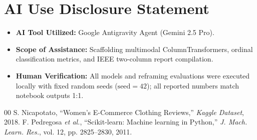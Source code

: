 \documentclass[conference]{IEEEtran}
\begin{document}
\newpage
\section*{AI Use Disclosure Statement}
\begin{itemize}
\item \textbf{AI Tool Utilized:} Google Antigravity Agent (Gemini 2.5 Pro).
\item \textbf{Scope of Assistance:} Scaffolding multimodal ColumnTransformers, ordinal classification metrics, and IEEE two-column report compilation.
\item \textbf{Human Verification:} All models and reframing evaluations were executed locally with fixed random seeds ($\text{seed}=42$); all reported numbers match notebook outputs 1:1.
\end{itemize}

\begin{thebibliography}{00}
 S. Nicapotato, ``Women's E-Commerce Clothing Reviews,'' \textit{Kaggle Dataset}, 2018.
 F. Pedregosa \textit{et al.}, ``Scikit-learn: Machine learning in Python,'' \textit{J. Mach. Learn. Res.}, vol. 12, pp. 2825--2830, 2011.
\end{thebibliography}
\end{document}
